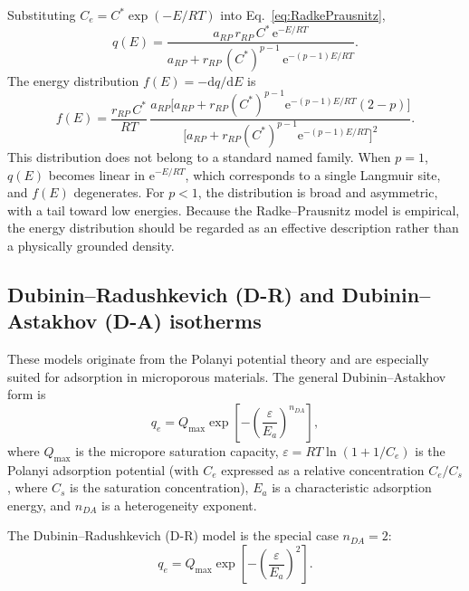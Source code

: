 \documentclass[12pt]{article}
\begin{document}
	Substituting $C_e = C^{\ast}\exp(-E/RT)$ into
	Eq.~\eqref{eq:RadkePrausnitz},
	\begin{equation}
		q(E)
		= \frac{a_{RP}\, r_{RP}\, C^{\ast}\,\mathrm{e}^{-E/RT}}
		{a_{RP} + r_{RP}\,(C^{\ast})^{p-1}\,
		\mathrm{e}^{-(p-1)E/RT}}.
		\label{eq:qE_RadkePrausnitz}
	\end{equation}
	The energy distribution $f(E) = -\mathrm{d}q/\mathrm{d}E$ is
	\begin{equation}
		f(E) = \frac{r_{RP}\,C^{\ast}}{RT}\,
		\frac{a_{RP}\bigl[a_{RP} + r_{RP}(C^{\ast})^{p-1}
		\mathrm{e}^{-(p-1)E/RT}(2-p)\bigr]}
		{\bigl[a_{RP} + r_{RP}(C^{\ast})^{p-1}
		\mathrm{e}^{-(p-1)E/RT}\bigr]^{2}}.
		\label{eq:fE_RadkePrausnitz}
	\end{equation}
	This distribution does not belong to a standard named family.
	When $p = 1$, $q(E)$ becomes linear in $\mathrm{e}^{-E/RT}$,
	which corresponds to a single Langmuir site, and $f(E)$ degenerates.
	For $p < 1$, the distribution is broad and asymmetric, with a tail
	toward low energies.  Because the Radke--Prausnitz model is
	empirical, the energy distribution should be regarded as an
	effective description rather than a physically grounded density.

	\subsection{Dubinin--Radushkevich (D-R) and Dubinin--Astakhov (D-A) isotherms}

	These models originate from the Polanyi potential theory and are
	especially suited for adsorption in microporous materials.  The
	general Dubinin--Astakhov form is
	\begin{equation}
		q_e = Q_{\max} \exp\!\left[
		-\left(\frac{\varepsilon}{E_a}\right)^{\!n_{DA}}
		\right],
		\label{eq:DA}
	\end{equation}
	where $Q_{\max}$ is the micropore saturation capacity,
	$\varepsilon = RT\ln(1 + 1/C_e)$ is the Polanyi adsorption
	potential (with $C_e$ expressed as a relative concentration
	$C_e/C_s$, where $C_s$ is the saturation concentration),
	$E_a$ is a characteristic adsorption energy, and $n_{DA}$ is
	a heterogeneity exponent.

	The Dubinin--Radushkevich (D-R) model is the special case $n_{DA} = 2$:
	\begin{equation}
		q_e = Q_{\max} \exp\!\left[
		-\left(\frac{\varepsilon}{E_a}\right)^{\!2}
		\right].
		\label{eq:DR}
	\end{equation}
\end{document}
